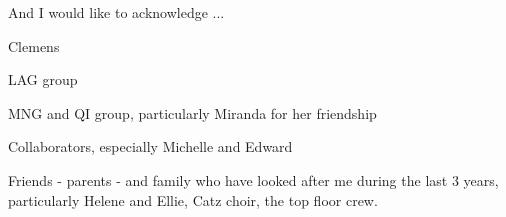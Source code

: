 
\begin{acknowledgements}      


And I would like to acknowledge ...

Clemens

LAG group

MNG and QI group, particularly Miranda for her friendship

Collaborators, especially Michelle and Edward

Friends - parents - and family who have looked after me during the last 3 years, particularly Helene and Ellie, Catz choir, the top floor crew.

\end{acknowledgements}
